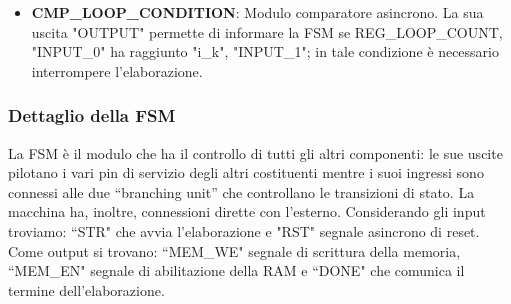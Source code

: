 \documentclass[a4paper]{article}
\begin{document}
\begin{itemize}
    \item \textbf{CMP\_LOOP\_CONDITION}: Modulo comparatore asincrono. La sua uscita "OUTPUT" permette di informare la FSM se REG\_LOOP\_COUNT, "INPUT\_0" ha raggiunto "i\_k", "INPUT\_1"; in tale condizione è necessario interrompere l’elaborazione.
\end{itemize}

\subsubsection{Dettaglio della FSM} %
La FSM è il modulo che ha il controllo di tutti gli altri componenti: le sue uscite pilotano i vari pin di servizio degli altri costituenti mentre i suoi ingressi sono connessi alle due “branching unit” che controllano le transizioni di stato.
La macchina ha, inoltre, connessioni dirette con l’esterno. Considerando gli input troviamo: “STR" che avvia l'elaborazione e "RST" segnale asincrono di reset. Come output si trovano: “MEM\_WE" segnale di scrittura della memoria, “MEM\_EN" segnale di abilitazione della RAM e “DONE" che comunica il termine dell'elaborazione.
\end{document}
